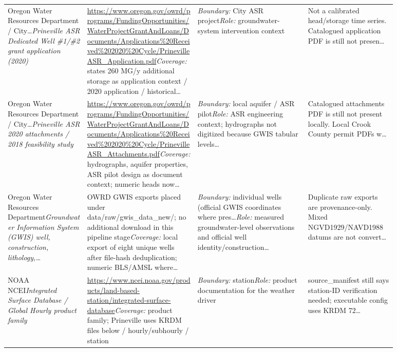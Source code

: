 \documentclass[11pt]{article}
\begin{document}
\begin{longtable}{@{}p{0.18\linewidth}p{0.25\linewidth}p{0.25\linewidth}p{0.20\linewidth}@{}}
Oregon Water Resources Department / City\ldots\newline \textit{Prineville ASR Dedicated Well \#1/\#2 grant application (2020)} & \url{https://www.oregon.gov/owrd/programs/FundingOpportunities/WaterProjectGrantAndLoans/Documents/Applications\%20Received\%202020\%20Cycle/PrinevilleASR_Application.pdf}\newline \textit{Coverage:} states 260 MG/y additional storage as application context / 2020 application / historical\ldots & \textit{Boundary:} City ASR project\newline \textit{Role:} groundwater-system intervention context & Not a calibrated head/storage time series. Catalogued application PDF is still not presen\ldots\\
Oregon Water Resources Department / City\ldots\newline \textit{Prineville ASR 2020 attachments / 2018 feasibility study} & \url{https://www.oregon.gov/owrd/programs/FundingOpportunities/WaterProjectGrantAndLoans/Documents/Applications\%20Received\%202020\%20Cycle/PrinevilleASR_Attachments.pdf}\newline \textit{Coverage:} hydrographs, aquifer properties, ASR pilot design as document context; numeric heads now\ldots & \textit{Boundary:} local aquifer / ASR pilot\newline \textit{Role:} ASR engineering context; hydrographs not digitized because GWIS tabular levels\ldots & Catalogued attachments PDF is still not present locally. Local Crook County permit PDFs w\ldots\\
Oregon Water Resources Department\newline \textit{Groundwater Information System (GWIS) well, construction, lithology,\ldots} & OWRD GWIS exports placed under data/raw/gwis\_data\_new/; no additional download in this pipeline stage\newline \textit{Coverage:} local export of eight unique wells after file-hash deduplication; numeric BLS/AMSL where\ldots & \textit{Boundary:} individual wells (official GWIS coordinates where pres\ldots\newline \textit{Role:} measured groundwater-level observations and official well identity/construction\ldots & Duplicate raw exports are provenance-only. Mixed NGVD1929/NAVD1988 datums are not convert\ldots\\
NOAA NCEI\newline \textit{Integrated Surface Database / Global Hourly product family} & \url{https://www.ncei.noaa.gov/products/land-based-station/integrated-surface-database}\newline \textit{Coverage:} product family; Prineville uses KRDM files below / hourly/subhourly / station & \textit{Boundary:} station\newline \textit{Role:} product documentation for the weather driver & source\_manifest still says station-ID verification needed; executable config uses KRDM 72\ldots\\

\end{longtable}
\end{document}
